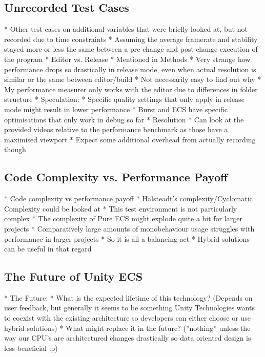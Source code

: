 \subsection{Unrecorded Test Cases}
   * Other test cases on additional variables that were briefly looked at, but not recorded due to time constraints 
      * Assuming the average framerate and stability stayed more or less the same between a pre change and post change execution of the program
   * Editor vs. Release
      * Mentioned in Methods
      * Very strange how performance drops so drastically in release mode, even when actual resolution is similar or the same between editor/build
      * Not necessarily easy to find out why
         * My performance measurer only works with the editor due to differences in folder structure
      * Speculation: 
         * Specific quality settings that only apply in release mode might result in lower performance
         * Burst and ECS have specific optimisations that only work in debug so far
   * Resolution
      * Can look at the provided videos relative to the performance benchmark as those have a maximised viewport
      * Expect some additional overhead from actually recording though
   
\subsection{Code Complexity vs. Performance Payoff}
   * Code complexity vs performance payoff
       * Halsteadt's complexity/Cyclomatic Complexity could be looked at
   * This test environment is not particularly complex
      * The complexity of Pure ECS might explode quite a bit for larger projects
         * Comparatively large amounts of monobehaviour usage struggles with performance in larger projects
         * So it is all a balancing act
      * Hybrid solutions can be useful in that regard
   
\subsection{The Future of Unity ECS} 
* The Future:
  * What is the expected lifetime of this technology? (Depends on user feedback, but generally it seems to be something Unity Technologies wants to coexist with the existing architecture so developers can either choose or use hybrid solutions)
  * What might replace it in the future? (''nothing'' unless the way our CPU's are architectured changes drastically so data oriented design is less beneficial :p)
